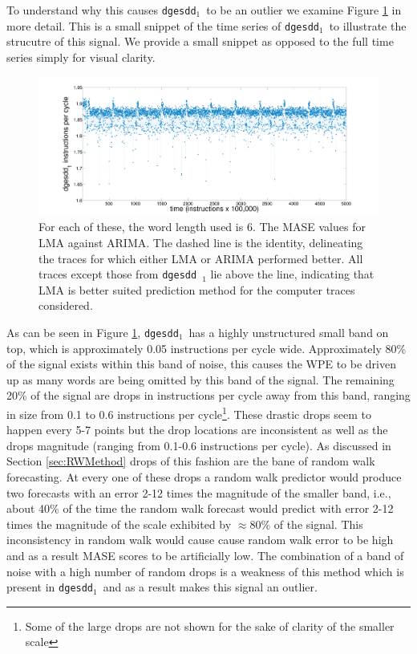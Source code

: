 \documentclass{article}
\newcommand{\svd}{{\tt dgesdd}~}
\newcommand{\svdone}{{\tt dgesdd}$_1$~}
\begin{document}
To understand why this causes \svdone to be an outlier we examine Figure \ref{fig:svdone-ts} in more detail. This is a small snippet of the time series of \svdone to illustrate the strucutre of this signal. We provide a small snippet as opposed to the full time series simply for visual clarity.
\begin{figure}[htbp]
  \centering
    \includegraphics[width=\textwidth]{figs/svdonets2}
\caption{ For each of these, the word length used is $6$. The MASE values for LMA against ARIMA. The dashed line is the identity, delineating the traces for which either LMA or ARIMA performed better. All traces except those from \svd$_1$ lie above the line, indicating that LMA is better suited prediction method for the computer traces considered.}\label{fig:svdone-ts}  
\end{figure} 
As can be seen in Figure \ref{fig:svdone-ts}, \svdone has a highly unstructured small band on top, which is approximately 0.05 instructions per cycle wide. Approximately 80\% of the signal exists within this band of noise, this causes the WPE to be driven up as many words are being omitted by this band of the signal. The remaining 20\% of the signal are drops in instructions per cycle away from this band, ranging in size from 0.1 to 0.6 instructions per cycle\footnote{Some of the large drops are not shown for the sake of clarity of the smaller scale}. These drastic drops seem to happen every 5-7 points but the drop locations are inconsistent as well as the drops magnitude (ranging from 0.1-0.6 instructions per cycle). As discussed in Section \ref{sec:RWMethod} drops of this fashion are the bane of random walk forecasting. At every one of these drops a random walk predictor would produce two forecasts with an error 2-12 times the magnitude of the smaller band, i.e., about 40\% of the time the random walk forecast would predict with error 2-12 times the magnitude of the scale exhibited by $\approx$80\% of the signal. This inconsistency in random walk would cause cause random walk error to be high and as a result MASE scores to be artificially low. The combination of a band of noise with a high number of random drops is a weakness of this method which is present in \svdone and as a result makes this signal an outlier.
\end{document}
